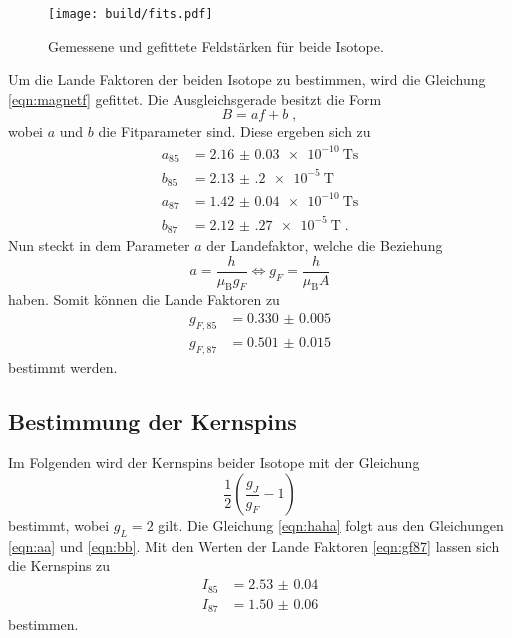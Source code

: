 \begin{figure}
    \centering
    \caption{Gemessene und gefittete Feldstärken für beide Isotope.}
    \label{fig:fit}
    \texttt{[image: build/fits.pdf]}
\end{figure}
Um die Lande Faktoren der beiden Isotope zu bestimmen, wird die Gleichung \eqref{eqn:magnetf} gefittet.
Die Ausgleichsgerade besitzt die Form
\begin{equation*}
    B =  af + b \; ,
\end{equation*} 
wobei $a$ und $b$ die Fitparameter sind.
Diese ergeben sich zu 
\begin{align*}
    a_{85} &= \qty{2.16(3)e-10}{\tesla\second}   \\
    b_{85} &= \qty{2.13(20)e-5}{\tesla}            \\
    a_{87} &= \qty{1.42(4)e-10}{\tesla\second}   \\
    b_{87} &= \qty{2.12(27)e-5}{\tesla}            \; .
\end{align*}
Nun steckt in dem Parameter $a$ der Landefaktor, welche die Beziehung 
\begin{equation*}
    a = \frac{h}{\mu_\text{B}g_F} \iff g_F = \frac{h}{\mu_\text{B}A}
\end{equation*}
haben.
Somit können die Lande Faktoren zu 
\begin{align}
    g_{F, 85} &= \num{0.330(5)} \\ 
    g_{F, 87} &= \num{0.501(15)}    \label{eqn:gf87}
\end{align}
bestimmt werden.
\subsection{Bestimmung der Kernspins}
Im Folgenden wird der Kernspins beider Isotope mit der Gleichung 
\begin{equation}
    \frac{1}{2}\left ( \frac{g_J}{g_F} - 1 \right ) \label{eqn:haha}
\end{equation}
bestimmt, wobei 
$g_L  = 2 $ gilt.
Die Gleichung \eqref{eqn:haha} folgt aus den Gleichungen \eqref{eqn:aa} und \eqref{eqn:bb}.
Mit den Werten der Lande Faktoren \eqref{eqn:gf87} lassen sich die Kernspins zu 
\begin{align*}
    I_{85} &= \num{2.53(4)} \\ 
    I_{87} &= \num{1.50(6)}  
\end{align*}
bestimmen.
